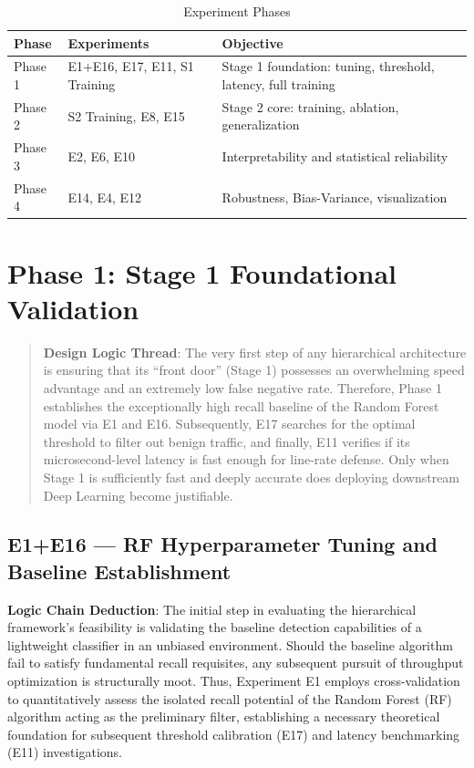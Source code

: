 \documentclass[sigconf]{acmart}
\begin{document}
\begin{table}[H]
\caption{Experiment Phases}
\label{tab:experiments}
\begin{tabular}{lll}
\toprule
\textbf{Phase} & \textbf{Experiments} & \textbf{Objective} \\
\midrule
Phase 1 & E1+E16, E17, E11, S1 Training & Stage 1 foundation: tuning, threshold, latency, full training \\
Phase 2 & S2 Training, E8, E15 & Stage 2 core: training, ablation, generalization \\
Phase 3 & E2, E6, E10 & Interpretability and statistical reliability \\
Phase 4 & E14, E4, E12 & Robustness, Bias-Variance, visualization \\
\bottomrule
\end{tabular}
\end{table}

\section{Phase 1: Stage 1 Foundational Validation}
\begin{quote}
\textbf{Design Logic Thread}: The very first step of any hierarchical architecture is ensuring that its ``front door'' (Stage 1) possesses an overwhelming speed advantage and an extremely low false negative rate. Therefore, Phase 1 establishes the exceptionally high recall baseline of the Random Forest model via E1 and E16. Subsequently, E17 searches for the optimal threshold to filter out benign traffic, and finally, E11 verifies if its microsecond-level latency is fast enough for line-rate defense. Only when Stage 1 is sufficiently fast and deeply accurate does deploying downstream Deep Learning become justifiable.
\end{quote}

\subsection{E1+E16 --- RF Hyperparameter Tuning and Baseline Establishment}
\textbf{Logic Chain Deduction}: The initial step in evaluating the hierarchical framework's feasibility is validating the baseline detection capabilities of a lightweight classifier in an unbiased environment. Should the baseline algorithm fail to satisfy fundamental recall requisites, any subsequent pursuit of throughput optimization is structurally moot. Thus, Experiment E1 employs cross-validation to quantitatively assess the isolated recall potential of the Random Forest (RF) algorithm acting as the preliminary filter, establishing a necessary theoretical foundation for subsequent threshold calibration (E17) and latency benchmarking (E11) investigations.
\end{document}

